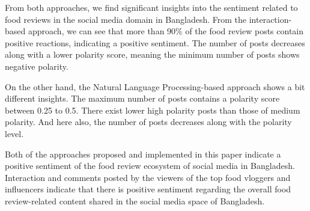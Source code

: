 From both approaches, we find significant insights into the sentiment related to food reviews in the social media domain in Bangladesh. From the interaction-based approach, we can see that more than 90\% of the food review posts contain positive reactions, indicating a positive sentiment. The number of posts decreases along with a lower polarity score, meaning the minimum number of posts shows negative polarity.

On the other hand, the Natural Language Processing-based approach shows a bit different insights. The maximum number of posts contains a polarity score between 0.25 to 0.5. There exist lower high polarity posts than those of medium polarity. And here also, the number of posts decreases along with the polarity level.

Both of the approaches proposed and implemented in this paper indicate a positive sentiment of the food review ecosystem of social media in Bangladesh. Interaction and comments posted by the viewers of the top food vloggers and influencers indicate that there is positive sentiment regarding the overall food review-related content shared in the social media space of Bangladesh.
